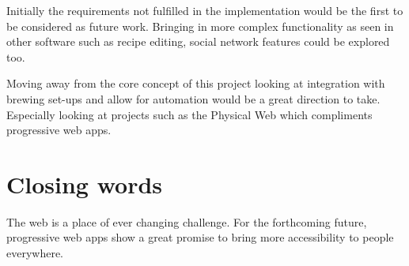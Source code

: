 Initially the requirements not fulfilled in the implementation would be the first to be considered as future work. Bringing in more complex functionality as seen in other software such as recipe editing, social network features could be explored too.

Moving away from the core concept of this project looking at integration with brewing set-ups and allow for automation would be a great direction to take. Especially looking at projects such as the Physical Web which compliments progressive web apps. \cite{physical_web}

\section{Closing words} \label{c--closing-words}

The web is a place of ever changing challenge. For the forthcoming future, progressive web apps show a great promise to bring more accessibility to people everywhere.
